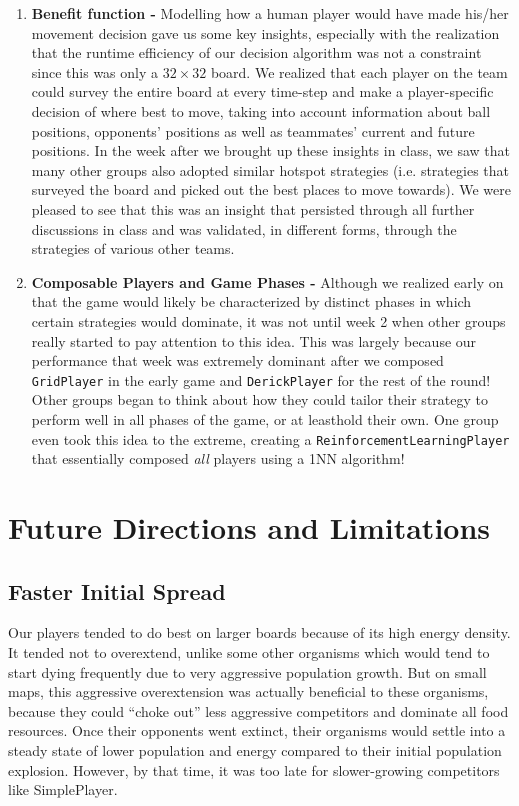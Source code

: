 \documentclass[
10pt, %
letterpaper, %
oneside, %
headinclude,footinclude, %
english
]{article}
\begin{document}
\begin{enumerate}
  \item \textbf{Benefit function - } Modelling how a human player would have made his/her movement decision gave us some key insights, especially with the realization that the runtime efficiency of our decision algorithm was not a constraint since this was only a $32 \times 32$ board. We realized that each player on the team could survey the entire board at every time-step and make a player-specific decision of where best to move, taking into account information about ball positions, opponents' positions as well as teammates' current and future positions. In the week after we brought up these insights in class, we saw that many other groups also adopted similar hotspot strategies (i.e. strategies that surveyed the board and picked out the best places to move towards). We were pleased to see that this was an insight that persisted through all further discussions in class and was validated, in different forms, through the strategies of various other teams.
  \item \textbf{Composable Players and Game Phases - } Although we realized early on that the game would likely be characterized by distinct phases in which certain strategies would dominate, it was not until week 2 when other groups really started to pay attention to this idea. This was largely because our performance that week was extremely dominant after we composed \texttt{GridPlayer} in the early game and \texttt{DerickPlayer} for the rest of the round! Other groups began to think about how they could tailor their strategy to perform well in all phases of the game, or at leasthold their own. One group even took this idea to the extreme, creating a \texttt{ReinforcementLearningPlayer} that essentially composed \textit{all} players using a 1NN algorithm!
\end{enumerate}

\section{Future Directions and Limitations}

\subsection{Faster Initial Spread}

Our players tended to do best on larger boards because of its high energy density. It tended not to overextend, unlike some other organisms which would tend to start dying frequently due to very aggressive population growth. But on small maps, this aggressive overextension was actually beneficial to these organisms, because they could ``choke out'' less aggressive competitors and dominate all food resources. Once their opponents went extinct, their organisms would settle into a steady state of lower population and energy compared to their initial population explosion. However, by that time, it was too late for slower-growing competitors like SimplePlayer.
\end{document}
